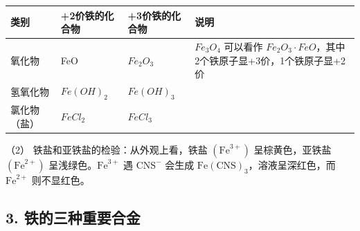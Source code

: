 {\def\LTcaptype{none} %
\begin{longtable}[]{@{}
  >{\raggedright\arraybackslash}p{}
  >{\raggedright\arraybackslash}p{}
  >{\raggedright\arraybackslash}p{}
  >{\raggedright\arraybackslash}p{}@{}}
\toprule\noalign{}
\begin{minipage}[b]{\linewidth}\raggedright
类别
\end{minipage} & \begin{minipage}[b]{\linewidth}\raggedright
+2价铁的化合物
\end{minipage} & \begin{minipage}[b]{\linewidth}\raggedright
+3价铁的化合物
\end{minipage} & \begin{minipage}[b]{\linewidth}\raggedright
说明
\end{minipage} \\
\midrule\noalign{}
\endhead
\bottomrule\noalign{}
\endlastfoot
氧化物 & FeO & \(Fe_{2}O_{3}\) & \(Fe_{3}O_{4}\) 可以看作
\(Fe_{2}O_{3}\cdot FeO\)，其中2个铁原子显+3价，1个铁原子显+2价 \\
氢氧化物 & \(Fe(OH)_{2}\) & \(Fe(OH)_{3}\) & \\
氯化物（盐） & \(FeCl_{2}\) & \(FeCl_{3}\) & \\
\end{longtable}
}

（2） 铁盐和亚铁盐的检验：从外观上看，铁盐
\(\left(\mathrm{Fe}^{3+}\right)\) 呈棕黄色，亚铁盐
\(\left(\mathrm{Fe}^{2+}\right)\) 呈浅绿色。\(\mathrm{Fe}^{3+}\) 遇
\(\mathrm{CNS}^{-}\) 会生成
\(\mathrm{Fe}(\mathrm{CNS})_{3}\)，溶液呈深红色，而 \(\mathrm{Fe}^{2+}\)
则不显红色。

\subsection{3. 铁的三种重要合金}

{\centering
\small\setlength{\tabcolsep}{3pt}%
\par
}

